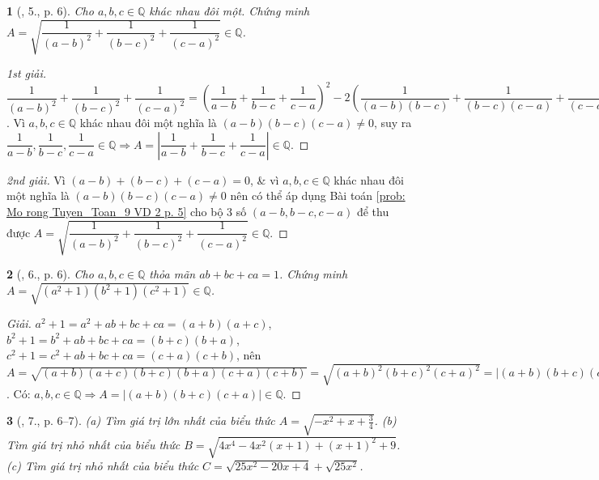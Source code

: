 \documentclass{article}
\newtheorem{baitoan}{}
\begin{document}
\begin{baitoan}[\cite{Tuyen_Toan_9_old}, 5., p. 6]
	Cho $a,b,c\in\mathbb{Q}$ khác nhau đôi một. Chứng minh $A = \sqrt{\dfrac{1}{(a - b)^2} + \dfrac{1}{(b - c)^2} + \dfrac{1}{(c - a)^2}}\in\mathbb{Q}$.
\end{baitoan}

\begin{proof}[1st giải]
	$\dfrac{1}{(a - b)^2} + \dfrac{1}{(b - c)^2} + \dfrac{1}{(c - a)^2} = \left(\dfrac{1}{a - b} + \dfrac{1}{b - c} + \dfrac{1}{c - a}\right)^2 - 2\left(\dfrac{1}{(a - b)(b - c)} + \dfrac{1}{(b - c)(c - a)} + \dfrac{1}{(c - a)(a - b)}\right) = \left(\dfrac{1}{a - b} + \dfrac{1}{b - c} + \dfrac{1}{c - a}\right)^2 - \dfrac{2(c - a + a - b + b - c)}{(a - b)(b - c)(c - a)} = \left(\dfrac{1}{a - b} + \dfrac{1}{b - c} + \dfrac{1}{c - a}\right)^2\Rightarrow A = \left|\dfrac{1}{a - b} + \dfrac{1}{b - c} + \dfrac{1}{c - a}\right|$. Vì $a,b,c\in\mathbb{Q}$ khác nhau đôi một nghĩa là $(a - b)(b - c)(c - a)\ne0$, suy ra $\dfrac{1}{a - b},\dfrac{1}{b - c},\dfrac{1}{c - a}\in\mathbb{Q}\Rightarrow A = \left|\dfrac{1}{a - b} + \dfrac{1}{b - c} + \dfrac{1}{c - a}\right|\in\mathbb{Q}$.
\end{proof}

\begin{proof}[2nd giải]
	Vì $(a - b) + (b - c) + (c - a) = 0$, \& vì $a,b,c\in\mathbb{Q}$ khác nhau đôi một nghĩa là $(a - b)(b - c)(c - a)\ne0$ nên có thể áp dụng Bài toán \ref{prob: Mo rong Tuyen_Toan_9 VD 2 p. 5} cho bộ 3 số $(a - b,b - c,c - a)$ để thu được $A = \sqrt{\dfrac{1}{(a - b)^2} + \dfrac{1}{(b - c)^2} + \dfrac{1}{(c - a)^2}}\in\mathbb{Q}$.
\end{proof}

\begin{baitoan}[\cite{Tuyen_Toan_9_old}, 6., p. 6]
	Cho $a,b,c\in\mathbb{Q}$ thỏa mãn $ab + bc + ca = 1$. Chứng minh $A = \sqrt{(a^2 + 1)(b^2 + 1)(c^2 + 1)}\in\mathbb{Q}$.
\end{baitoan}

\begin{proof}[Giải]
	$a^2 + 1 = a^2 + ab + bc + ca = (a + b)(a + c)$, $b^2 + 1 = b^2 + ab + bc + ca = (b + c)(b + a)$, $c^2 + 1 = c^2 + ab + bc + ca = (c + a)(c + b)$, nên $A = \sqrt{(a + b)(a + c)(b + c)(b + a)(c + a)(c + b)} = \sqrt{(a + b)^2(b + c)^2(c + a)^2} = |(a + b)(b + c)(c + a)|$. Có: $a,b,c\in\mathbb{Q}\Rightarrow A = |(a + b)(b + c)(c + a)|\in\mathbb{Q}$.
\end{proof}

\begin{baitoan}[\cite{Tuyen_Toan_9_old}, 7., p. 6--7]
	(a) Tìm giá trị lớn nhất của biểu thức $A = \sqrt{-x^2 + x + \frac{3}{4}}$. (b) Tìm giá trị nhỏ nhất của biểu thức $B = \sqrt{4x^4 - 4x^2(x + 1) + (x + 1)^2 + 9}$. (c) Tìm giá trị nhỏ nhất của biểu thức $C = \sqrt{25x^2 - 20x + 4} + \sqrt{25x^2}$.
\end{baitoan}
\end{document}

